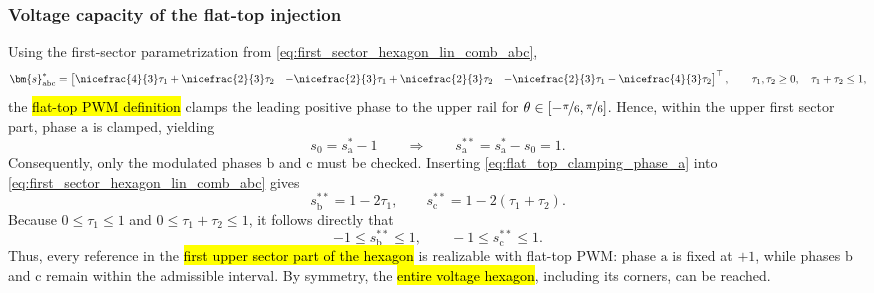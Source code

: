 \begin{frame}
    \frametitle{Voltage capacity of the flat-top injection}
    Using the first-sector parametrization from \eqref{eq:first_sector_hexagon_lin_comb_abc},
    \begin{equation*}
        \bm{s}^*_\mathrm{abc} =
        \begin{bmatrix}
            \nicefrac{4}{3}\tau_1 + \nicefrac{2}{3}\tau_2  &
            -\nicefrac{2}{3}\tau_1 + \nicefrac{2}{3}\tau_2 &
            -\nicefrac{2}{3}\tau_1 - \nicefrac{4}{3}\tau_2
        \end{bmatrix}^\top,
        \qquad
        \tau_1,\tau_2\geq 0, \quad \tau_1+\tau_2\leq 1,
    \end{equation*}
    the \hl{flat-top PWM definition} clamps the leading positive phase to the upper rail for $\theta\in[-\nicefrac{\pi}{6}, \nicefrac{\pi}{6}]$. \pause Hence, within the upper first sector part, phase \(\mathrm{a}\) is clamped, yielding
    \begin{equation}
        s_0=s_\mathrm{a}^*-1
        \qquad \Rightarrow \qquad
        s_\mathrm{a}^{**}=s_\mathrm{a}^*-s_0=1.
        \label{eq:flat_top_clamping_phase_a}
    \end{equation}
    Consequently, only the modulated phases \(\mathrm{b}\) and \(\mathrm{c}\) must be checked. \pause Inserting \eqref{eq:flat_top_clamping_phase_a} into \eqref{eq:first_sector_hexagon_lin_comb_abc} gives
    \begin{equation}
        s_\mathrm{b}^{**}=1-2\tau_1, \qquad
        s_\mathrm{c}^{**}=1-2(\tau_1+\tau_2).
    \end{equation}\pause
    Because \(0\leq \tau_1\leq 1\) and \(0\leq \tau_1+\tau_2\leq 1\), it follows directly that
    \begin{equation}
        -1\leq s_\mathrm{b}^{**}\leq 1, \qquad -1\leq s_\mathrm{c}^{**}\leq 1.
    \end{equation}\pause
    Thus, every reference in the \hl{first upper sector part of the hexagon} is realizable with flat-top PWM: phase \(\mathrm{a}\) is fixed at \(+1\), while phases \(\mathrm{b}\) and \(\mathrm{c}\) remain within the admissible interval. \pause By symmetry, the \hl{entire voltage hexagon}, including its corners, can be reached.
\end{frame}

